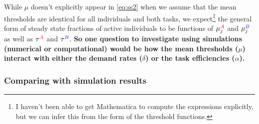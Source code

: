 \documentclass[10pt]{article}
\newcommand{\A}{{\color{red}A}}
\newcommand{\B}{{\color{blue}B}}
\begin{document}
While $\mu$ doesn't explicitly appear in \eqref{eq:ss2} when we assume that the mean thresholds are identical for all individuals and both tasks, we expect\footnote{I haven't been able to get Mathematica to compute the expressions explicitly, but we can infer this from the form of the threshold functions.} the general form of steady state fractions of active individuals to be functions of $\mu_j^{\A}$ and $\mu_j^{\B}$ as well as $\tau^{\A}$ and $\tau^{\B}$. \textbf{So one question to investigate using simulations (numerical or computational) would be \textbf{how the mean thresholds ($\mu$) interact with either the demand rates ($\delta$) or the task efficiencies ($\alpha$)}.}

\subsubsection{Comparing with simulation results}
\end{document}
